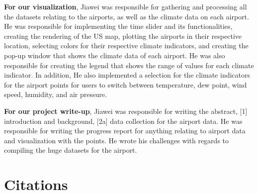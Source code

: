 \documentclass[10pt,twocolumn,twoside]{opticajnl}
\begin{document}
\textbf{For our visualization}, Jiawei was responsible for gathering and processing all the datasets relating to the airports, as well as the climate data on each airport. He was responsible for implementing the time slider and its functionalities, creating the rendering of the US map, plotting the airports in their respective location, selecting colors for their respective climate indicators, and creating the pop-up window that shows the climate data of each airport. He was also responsible for creating the legend that shows the range of values for each climate indicator. In addition, He also implemented a selection for the climate indicators for the airport points for users to switch between temperature, dew point, wind speed, humidity, and air pressure.

\textbf{For our project write-up}, Jiawei was responsible for writing the abstract, [1] introduction and background, [2a] data collection for the airport data. He was responsible for writing the progress report for anything relating to airport data and visualization with the points. He wrote his challenges with regards to compiling the huge datasets for the airport.

\section {Citations}

% 

\end{document}
